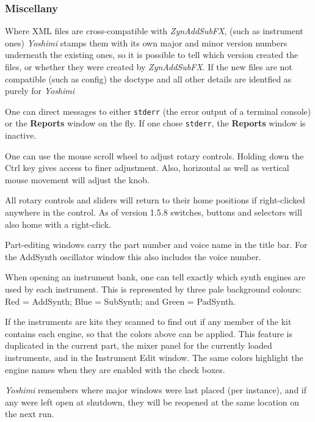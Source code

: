 \documentclass[
 11pt,
 twoside,
 a4paper,
 final                                 %
]{article}
\begin{document}
\subsubsection{Miscellany}
\label{subsubsec:new_features_miscellany}

   Where XML files are cross-compatible with \textsl{ZynAddSubFX},
   (such as instrument ones) \textsl{Yoshimi} stamps them with its own major
   and minor version numbers underneath the existing ones, so it is possible
   to tell which version created the files, or whether they were created by \textsl{ZynAddSubFX}. If the new files are not compatible (such as config)
   the doctype and all other details are identfied as purely for
   \textsl{Yoshimi}

   One can direct messages to either \texttt{stderr}
   (the error output of a terminal console) or the \textbf{Reports} window
   on the fly. If one chose \texttt{stderr}, the \textbf{Reports} window is
   inactive.

   One can use the mouse scroll wheel to adjust rotary controls. Holding
   down the Ctrl key gives access to finer adjustment.  Also, horizontal as
   well as vertical mouse movement will adjust the knob.

   All rotary controls and sliders will return
   to their home positions if right-clicked anywhere in the control.
   As of version 1.5.8 switches, buttons and
   selectors will also home with a right-click.

   Part-editing windows carry the part number and voice name in the title bar.
   For the AddSynth oscillator window this also includes the voice number.

   When opening an instrument bank, one can tell exactly which synth
   engines are used by each instrument. This is represented by three pale
   background colours: Red = AddSynth; Blue = SubSynth; and Green = PadSynth.

   If the instruments are kits they scanned to find out if any member of the
   kit contains each engine, so that the colors above can be applied.
   This feature is duplicated in the current part, the mixer panel for the
   currently loaded instruments, and in the Instrument Edit window.
   The same colors highlight the engine names when they are enabled with the
   check boxes.

   \textsl{Yoshimi} remembers where major windows were last placed (per
   instance), and if any were left open at shutdown, they will be reopened at
   the same location on the next run.
\end{document}
